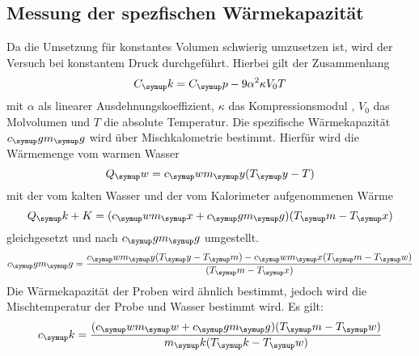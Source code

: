\subsection{Messung der spezfischen Wärmekapazität}
Da die Umsetzung für konstantes Volumen schwierig umzusetzen ist, wird der
Versuch bei konstantem Druck durchgeführt. Hierbei gilt der Zusammenhang
\begin{equation}
  C_\su{k} = C_\su{p}-9\alpha^2\kappa V_0T
\end{equation}
mit $\alpha$ als linearer Ausdehnungskoeffizient, $\kappa$ das Kompressionsmodul
, $V_0$ das Molvolumen und $T$ die absolute Temperatur. Die spezifische
Wärmekapazität $c_\su{g}m_\su{g}$ wird über Mischkalometrie bestimmt.
Hierfür wird die Wärmemenge vom warmen Wasser
\begin{equation}
  Q_\su{w}=c_\su{w}m_\su{y}(T_\su{y}-T)
\end{equation}
mit der vom kalten Wasser und der vom Kalorimeter aufgenommenen Wärme
\begin{equation}
  Q_\su{k+K}=(c_\su{w}m_\su{x}+c_\su{g}m_\su{g})(T_\su{m}-T_\su{x})
\end{equation}
gleichgesetzt und nach $c_\su{g}m_\su{g}$ umgestellt.
\begin{equation}
  c_\su{g}m_\su{g}=\frac{c_\su{w}m_\su{y}(T_\su{y}-T_\su{m})-c_\su{w}m_\su{x}
  (T_\su{m}-T_\su{w})}{(T_\su{m}-T_\su{x})}
\end{equation}
Die Wärmekapazität der Proben wird ähnlich bestimmt, jedoch wird die
Mischtemperatur der Probe und Wasser bestimmt wird. Es gilt:
\begin{equation}
  c_\su{k}=\frac{(c_\su{w}m_\su{w}+c_\su{g}m_\su{g})(T_\su{m}-T_\su{w})}
  {m_\su{k}(T_\su{k}-T_\su{w})}
\end{equation}
